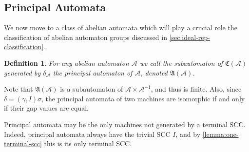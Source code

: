 \documentclass[12pt, letterpaper]{article}
\newcommand{\A}{\mathcal A}
\newcommand{\comp}{\mathfrak C}
\newcommand{\princ}{\mathfrak A}
\newtheorem{defn}[thm]{Definition}
\begin{document}
\subsection{Principal Automata}\label{sec:principal}
We now move to a class of abelian automata which will play a crucial role the
classification of abelian automaton groups discussed in
\cref{sec:ideal-rep-classification}.

\begin{defn}
    For any abelian automaton $\A$ we call the subautomaton of $\comp(\A)$
    generated by $\delta_\A$ the principal automaton of $\A$, denoted
    $\princ(\A)$.
\end{defn}

Note that $\princ(\A)$ is a subautomaton of $\A \times \A^{-1}$, and thus is
finite. Also, since $\delta = (\gamma, I) \sigma$, the principal automata of
two machines are isomorphic if and only if their gap values are equal.

Principal automata may be the only machines not generated by a terminal SCC.
Indeed, principal automata always have the trivial SCC $I$, and by
\cref{lemma:one-terminal-scc} this is its only terminal SCC.
\end{document}
